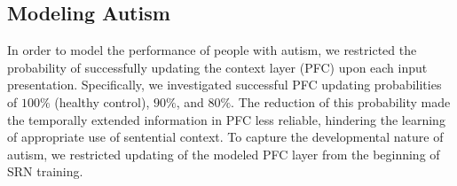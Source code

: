 
\subsection{Modeling Autism}

In order to model the performance of people with autism, we restricted the probability of successfully updating the context layer (PFC) upon each input presentation. Specifically, we investigated successful PFC updating probabilities of $100\%$ (healthy control), $90\%$, and $80\%$. The reduction of this probability made the temporally extended information in PFC less reliable, hindering the learning of appropriate use of sentential context. To capture the developmental nature of autism, we restricted updating of the modeled PFC layer from the beginning of SRN training.

